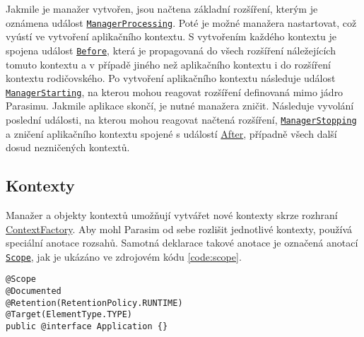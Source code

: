 Jakmile je manažer vytvořen,
jsou načtena zá\-klad\-ní rozšíření, kterým je oznámena událost \href{https://github.com/sybila/parasim/blob/2.0.0.Final/core/src/main/java/org/sybila/parasim/core/event/ManagerProcessing.java}{\texttt{ManagerProcessing}}.
Poté je možné manažera nastartovat, což vyústí ve vytvoření aplikačního kontextu.
S vytvořením každého kontextu je spojena událost \href{https://github.com/sybila/parasim/blob/2.0.0.Final/core/src/main/java/org/sybila/parasim/core/event/Before.java}{\texttt{Before}}, která je propagovaná
do všech roz\-ší\-ře\-ní náležejících tomuto kontextu a v případě jiného než
aplikačního kontextu i do rozšíření kontextu rodičovského.
Po vytvoření aplikačního kontextu následuje událost \href{https://github.com/sybila/parasim/blob/2.0.0.Final/core/src/main/java/org/sybila/parasim/core/event/ManagerStarted.java}{\texttt{ManagerStarting}},
na kterou mohou reagovat rozšíření definovaná mimo jádro Parasimu. Jakmile aplikace skončí,
je nutné ma\-na\-že\-ra zničit. Následuje vyvolání poslední u\-dá\-los\-ti, na kterou mohou reagovat načtená rozšíření, \href{https://github.com/sybila/parasim/blob/2.0.0.Final/core/src/main/java/org/sybila/parasim/core/event/ManagerStopping.java}{\texttt{ManagerStopping}}
a zničení aplikačního kontextu spojené s událostí \href{https://github.com/sybila/parasim/blob/2.0.0.Final/core/src/main/java/org/sybila/parasim/core/event/After.java}{After}, případně všech další dosud nezničených kontextů.

\subsection{Kontexty}

Manažer a objekty kontextů umožňují vytvářet nové kontexty skrze rozhraní \href{https://github.com/sybila/parasim/blob/2.0.0.Final/core/src/main/java/org/sybila/parasim/core/api/ContextFactory.java}{ContextFactory}.
Aby mohl Parasim od se\-be rozlišit jednotlivé kontexty, používá speciální anotace
rozsahů. Samotná deklarace takové anotace je označená anotací \href{https://github.com/sybila/parasim/blob/2.0.0.Final/core/src/main/java/org/sybila/parasim/core/annotation/Scope.java}{\texttt{Scope}},
jak je ukázáno ve zdrojovém kódu \ref{code:scope}.

\begin{lstlisting}[label={code:scope}, caption={Anotace rozsahu}, style=Java]
@Scope
@Documented
@Retention(RetentionPolicy.RUNTIME)
@Target(ElementType.TYPE)
public @interface Application {}
\end{lstlisting}

